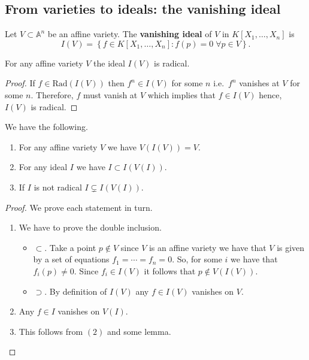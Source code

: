 \documentclass[12pt, a4paper]{article}
\renewcommand{\AA}{\mathbb A}
\begin{document}
\subsection{From varieties to ideals: the vanishing ideal}

\begin{definition}
    Let \(V \subset \AA^n\) be an affine variety. The \textbf{vanishing ideal} of \(V\) in \(K[X_1,\ldots,X_n]\) is 
    \[I(V)=\left\{ f\in K[X_1,\ldots,X_n] : f(p)=0 \; \forall p\in V \right\}.\]
\end{definition}

\begin{lemma}
    For any affine variety \(V\) the ideal \(I(V)\) is radical.
\end{lemma}

\begin{proof}
    If \(f \in \text{Rad}(I(V))\) then \(f^n \in I(V)\) for some \(n\) i.e.\ \(f^n\) vanishes at \(V\) for some \(n\). Therefore, \(f\) must vanish at \(V\) which implies that \(f\in I(V)\) hence, \(I(V)\) is radical.
\end{proof}

\begin{mdlemma}
    We have the following.
    \begin{enumerate}
        \item For any affine variety \(V\) we have \(V(I(V))=V\).
        \item For any ideal \(I\) we have \(I\subset I(V(I))\).
        \item If \(I\) is not radical \(I\subsetneq I(V(I))\).
    \end{enumerate}
\end{mdlemma}

\begin{proof}
    We prove each statement in turn.
    \begin{enumerate}
    \item We have to prove the double inclusion.
        \begin{itemize}
            \item \(\subset\). Take a point \(p \not\in V\) since \(V\) is an affine variety we have that \(V\) is given by a set of equations \(f_1=\cdots=f_n =0\). So, for some \(i\) we have that \(f_i(p)\neq 0\). Since \(f_i \in I(V)\) it follows that \(p\not\in V(I(V))\).
            \item \(\supset\). By definition of \(I(V)\) any \(f\in I(V)\) vanishes on \(V\). 
        \end{itemize}
    \item Any \(f\in I\) vanishes on \(V(I)\).
    \item This follows from \((2)\) and some lemma.
    \end{enumerate}
\end{proof}
\end{document}

